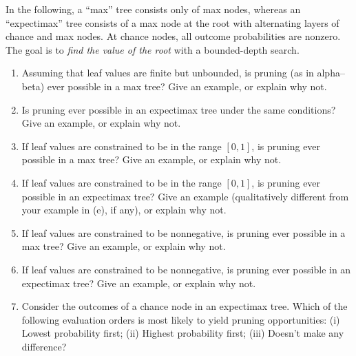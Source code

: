 \begin{iexercise}
In the following, a ``max'' tree consists only of max nodes, whereas an ``expectimax'' tree consists
of a max node at the root with alternating layers of chance and max nodes. At chance nodes, all outcome
probabilities are nonzero. The goal is to
{\em find the value of the root} with a bounded-depth search.
\begin{enumerate}
\item Assuming that leaf values
are finite but unbounded, is pruning (as in alpha--beta) ever possible 
in a max tree? Give an example, or explain why not.

\item Is pruning ever possible 
in an expectimax tree under the same conditions? Give an example, or explain why not.

\item If leaf values are constrained to be in the range \([0,1]\), is pruning ever possible 
in a max tree? Give an example, or explain why not.

\item If leaf values are constrained to be in the range \([0,1]\), is pruning ever possible 
in an expectimax tree? Give an example (qualitatively different from your example in (e), if any), or explain why not.

\item If leaf values are constrained to be nonnegative, is pruning ever possible 
in a max tree? Give an example, or explain why not.

\item If leaf values are constrained to be nonnegative, is pruning ever possible 
in an expectimax tree? Give an example, or explain why not.

\item Consider the outcomes of a chance node in an expectimax tree.
Which of the following evaluation orders is most likely to yield pruning opportunities:
(i) Lowest probability first; (ii) Highest probability first; (iii) Doesn't make any difference?
\end{enumerate}
\end{iexercise} 



